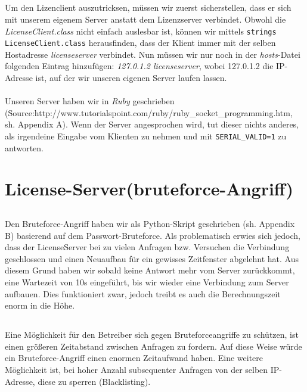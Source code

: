\documentclass{scrartcl}
\begin{document}
    \subsection{}
    \label{sub:3.2}
      Um den Lizenclient auszutricksen, müssen wir zuerst sicherstellen, dass
      er sich mit unserem eigenem Server anstatt dem Lizenzserver verbindet.
      Obwohl die \textit{LicenseClient.class} nicht einfach auslesbar ist,
      können wir mittels \texttt{strings LicenseClient.class} herausfinden,
      dass der Klient immer mit der selben Hostadresse \textit{licenseserver}
      verbindet.
      Nun müssen wir nur noch in der \textit{hosts}-Datei folgenden Eintrag
      hinzufügen: \textit{127.0.1.2 licenseserver}, wobei 127.0.1.2 die
      IP-Adresse ist, auf der wir unseren eigenen Server laufen lassen.\\\\
      Unseren Server haben wir in \textit{Ruby} geschrieben\\
      (Source:http://www.tutorialspoint.com/ruby/ruby\_socket\_programming.htm,
      sh. Appendix A). Wenn der Server angesprochen wird, tut dieser nichts
      anderes, als irgendeine Eingabe vom Klienten zu nehmen und mit
      \texttt{SERIAL\_VALID=1} zu antworten.
    \subsection{}
    \label{sub:3.3}

  \section{License-Server(bruteforce-Angriff)}
  \label{sec:License-Server(bruteforce-Angriff)}
    \subsection{}
    \label{sub:4.1}
      Den Bruteforce-Angriff haben wir als Python-Skript geschrieben (sh.
      Appendix B) basierend auf dem Passwort-Bruteforce. Als problematisch
      erwies sich jedoch, dass der LicenseServer bei zu vielen Anfragen bzw.
      Versuchen die Verbindung geschlossen und einen Neuaufbau für ein
      gewisses Zeitfenster abgelehnt hat. Aus diesem Grund haben wir sobald
      keine Antwort mehr vom Server zurückkommt, eine Wartezeit von 10s
      eingeführt, bis wir wieder eine Verbindung zum Server aufbauen. Dies
      funktioniert zwar, jedoch treibt es auch die Berechnungszeit enorm in die
      Höhe.
    \subsection{}
    \label{sub:4.2}
      Eine Möglichkeit für den Betreiber sich gegen Bruteforceangriffe zu
      schützen, ist einen größeren Zeitabstand zwischen Anfragen zu fordern.
      Auf diese Weise würde ein Bruteforce-Angriff einen enormen Zeitaufwand
      haben. Eine weitere Möglichkeit ist, bei hoher Anzahl subsequenter
      Anfragen von der selben IP-Adresse, diese zu sperren (Blacklisting).
\end{document}
